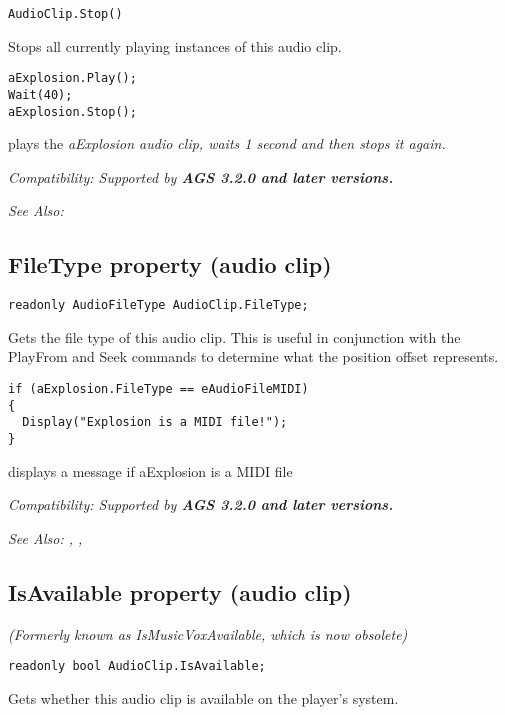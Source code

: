 \begin{verbatim}
AudioClip.Stop()
\end{verbatim}
Stops all currently playing instances of this audio clip.

\begin{verbatim}
aExplosion.Play();
Wait(40);
aExplosion.Stop();
\end{verbatim}
plays the \it{aExplosion} audio clip, waits 1 second and then stops it again.

\it{Compatibility:} Supported by \bf{AGS 3.2.0} and later versions.

\it{See Also:} 


\subsection{FileType property (audio clip)}\label{AudioClip.FileType}%

\begin{verbatim}
readonly AudioFileType AudioClip.FileType;
\end{verbatim}
Gets the file type of this audio clip. This is useful in conjunction with the PlayFrom
and Seek commands to determine what the position offset represents.

\begin{verbatim}
if (aExplosion.FileType == eAudioFileMIDI)
{
  Display("Explosion is a MIDI file!");
}
\end{verbatim}
displays a message if aExplosion is a MIDI file

\it{Compatibility:} Supported by \bf{AGS 3.2.0} and later versions.

\it{See Also:} ,
,


\subsection{IsAvailable property (audio clip)}\label{AudioClip.IsAvailable}%

\it{(Formerly known as IsMusicVoxAvailable, which is now obsolete)}

\begin{verbatim}
readonly bool AudioClip.IsAvailable;
\end{verbatim}
Gets whether this audio clip is available on the player's system.

